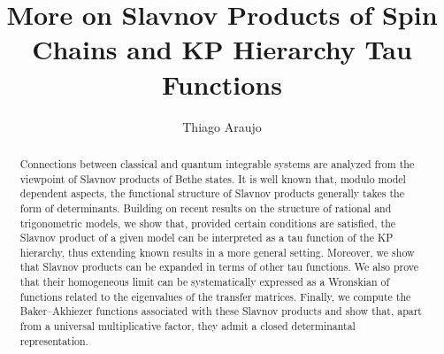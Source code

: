 \documentclass[a4paper,12pt]{amsart}
\begin{document}

\title[Slavnov products, KP and BA functions]{More on Slavnov Products of Spin Chains and KP Hierarchy Tau Functions}

\author{Thiago Araujo}

\address{
Universidade Federal Fluminense, 
Instituto de Ciências Exatas, Departamento de Física
Volta Redonda, RJ, Brazil
}


\begin{abstract}
 Connections between classical and quantum integrable systems are
 analyzed from the viewpoint of Slavnov products of Bethe states. It
 is well known that, modulo model dependent aspects, the functional
 structure of Slavnov products generally takes the form of
 determinants. Building on recent results on the structure of rational
 and trigonometric models, we show that, provided certain conditions
 are satisfied, the Slavnov product of a given model can be
 interpreted as a tau function of the KP hierarchy, thus extending
 known results in a more general setting. Moreover, we show that
 Slavnov products can be expanded in terms of other tau functions. We
 also prove that their homogeneous limit can be systematically
 expressed as a Wronskian of functions related to the eigenvalues of
 the transfer matrices.  Finally, we compute the Baker–Akhiezer
 functions associated with these Slavnov products and show that, apart
 from a universal multiplicative factor, they admit a closed
 determinantal representation.
\end{abstract}


\maketitle
\end{document}
